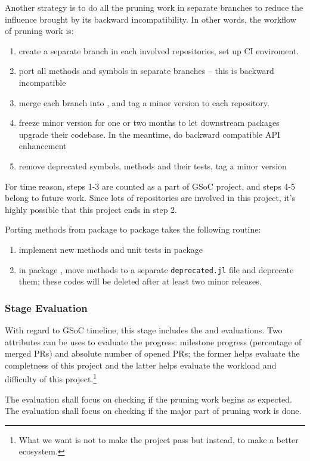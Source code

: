 \newcommand{\packageA}{package \sname{A}\xspace}
\newcommand{\packageB}{package \sname{B}\xspace}
Another strategy is to do all the pruning work in separate branches to reduce the influence brought by its backward incompatibility. In other words, the workflow of pruning work is:
\begin{enumerate}
    \item create a separate branch  in each involved repositories, set up CI enviroment.
    \item port all methods and symbols in separate branches -- this is backward incompatible
    \item merge each branch into , and tag a minor version to each repository.
    \item freeze minor version for one or two months to let downstream packages upgrade their codebase. In the meantime, do backward compatible API enhancement
    \item remove deprecated symbols, methods and their tests, tag a minor version
\end{enumerate}
For time reason, steps 1-3 are counted as a part of GSoC project, and steps 4-5 belong to future work. Since lots of repositories are involved in this project, it's highly possible that this project ends in step 2.\par

Porting methods from \packageA to \packageB takes the following routine:
\begin{enumerate}
    \item implement new methods and unit tests in \packageB
    \item in \packageA, move methods to a separate \texttt{deprecated.jl} file and deprecate them; these codes will be deleted after at least two minor releases.
\end{enumerate}

\subsubsection*{Stage Evaluation}

With regard to GSoC timeline, this stage includes the  and  evaluations. Two attributes can be uses to evaluate the progress: milestone progress (percentage of merged PRs) and absolute number of opened PRs; the former helps evaluate the completness of this project and the latter helps evaluate the workload and difficulty of this project.\footnote{What we want is not to make the project pass but instead, to make \images{} a better ecosystem.}

The  evaluation shall focus on checking if the pruning work begins as expected. The  evaluation shall focus on checking if the major part of pruning work is done.

